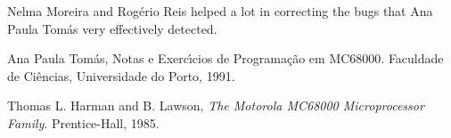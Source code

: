 \documentclass[a4,11pt]{article}
\begin{document}
Nelma Moreira and Rog\'erio Reis helped a lot in correcting the bugs
that Ana Paula Tom\'as very effectively detected.

\begin{thebibliography}{X}

Ana Paula Tom\'as, Notas e Exerc\'{\i}cios de Pro\-gra\-ma\-\c{c}\~ao
em MC68000. Fa\-cul\-da\-de de Ci\-\^en\-ci\-as,
Uni\-ver\-si\-da\-de do Por\-to, 1991.

Thomas L. Harman and B. Lawson, {\em The Motorola MC68000
Microprocessor Family}. Prentice-Hall, 1985.

\end{thebibliography}
\end{document}
